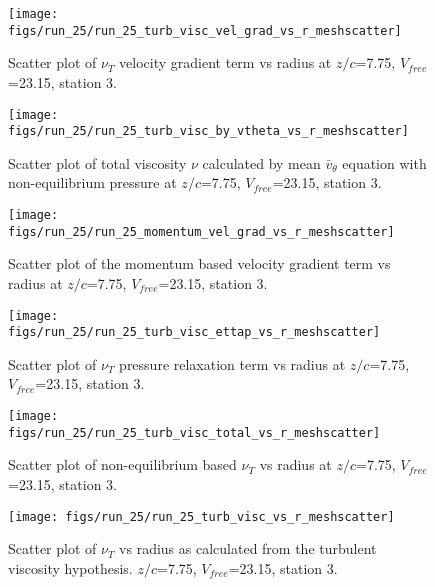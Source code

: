 \begin{figure}[H]
\centering
\texttt{[image: figs/run\_25/run\_25\_turb\_visc\_vel\_grad\_vs\_r\_meshscatter]}
\caption{Scatter plot of $\nu_T$ velocity gradient term vs radius at $z/c$=7.75, $V_{free}$=23.15, station 3.}
\end{figure}


\begin{figure}[H]
\centering
\texttt{[image: figs/run\_25/run\_25\_turb\_visc\_by\_vtheta\_vs\_r\_meshscatter]}
\caption{Scatter plot of total viscosity $\nu$ calculated by mean $\bar{v}_{\theta}$ equation with non-equilibrium pressure at $z/c$=7.75, $V_{free}$=23.15, station 3.}
\end{figure}


\begin{figure}[H]
\centering
\texttt{[image: figs/run\_25/run\_25\_momentum\_vel\_grad\_vs\_r\_meshscatter]}
\caption{Scatter plot of the momentum based velocity gradient term vs radius at $z/c$=7.75, $V_{free}$=23.15, station 3.}
\end{figure}


\begin{figure}[H]
\centering
\texttt{[image: figs/run\_25/run\_25\_turb\_visc\_ettap\_vs\_r\_meshscatter]}
\caption{Scatter plot of $\nu_T$ pressure relaxation term vs radius at $z/c$=7.75, $V_{free}$=23.15, station 3.}
\end{figure}


\begin{figure}[H]
\centering
\texttt{[image: figs/run\_25/run\_25\_turb\_visc\_total\_vs\_r\_meshscatter]}
\caption{Scatter plot of non-equilibrium based $\nu_T$ vs radius at $z/c$=7.75, $V_{free}$=23.15, station 3.}
\end{figure}


\begin{figure}[H]
\centering
\texttt{[image: figs/run\_25/run\_25\_turb\_visc\_vs\_r\_meshscatter]}
\caption{Scatter plot of $\nu_T$ vs radius as calculated from the turbulent viscosity hypothesis. $z/c$=7.75, $V_{free}$=23.15, station 3.}
\end{figure}



